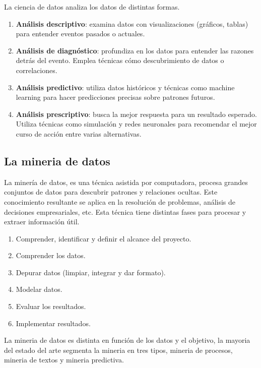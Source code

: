 La ciencia de datos analiza los datos de distintas formas.

\begin{enumerate}
    \item \textbf{Análisis descriptivo}: examina datos con visualizaciones (gráficos, tablas) para entender eventos pasados o actuales.
    \item \textbf{Análisis de diagnóstico}: profundiza en los datos para entender las razones detrás del evento. Emplea técnicas cómo descubrimiento de datos o correlaciones.
    \item \textbf{Análisis predictivo}: utiliza datos históricos y técnicas como machine learning para hacer predicciones precisas sobre patrones futuros.
    \item \textbf{Análisis prescriptivo}: busca la mejor respuesta para un resultado esperado. Utiliza técnicas como simulación y redes neuronales para recomendar el mejor curso de acción entre varias alternativas.
\end{enumerate}


\subsection{La mineria de datos}

La minería de datos, es una técnica asistida por computadora, procesa grandes conjuntos de datos para descubrir patrones y relaciones ocultas. Este conocimiento resultante se aplica en la resolución de problemas, análisis de decisiones empresariales, etc. Esta técnica tiene distintas fases para procesar y extraer información útil.

\begin{enumerate}
    \item Comprender, identificar y definir el alcance del proyecto.
    \item Comprender los datos.
    \item Depurar datos (limpiar, integrar y dar formato).
    \item Modelar datos.
    \item Evaluar los resultados.
    \item Implementar resultados.
\end{enumerate}

La mineria de datos es distinta en función de los datos y el objetivo, la mayoria del estado del arte segmenta la mineria en tres tipos, mineria de procesos, mineria de textos y mineria predictiva.

